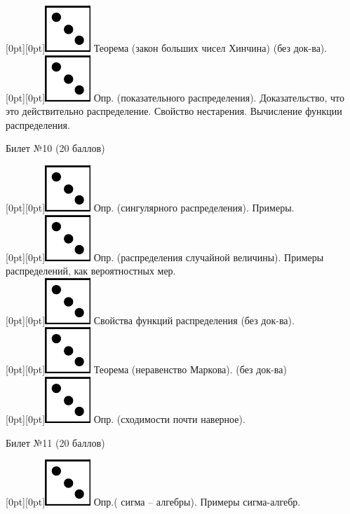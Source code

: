 \documentclass[preview]{standalone}
\begin{document}
\raisebox{-1pt}[0pt][0pt]{\includegraphics[width=0.02\linewidth]{3.png}} Теорема (закон больших чисел Хинчина) (без док-ва). \\
\raisebox{-1pt}[0pt][0pt]{\includegraphics[width=0.02\linewidth]{3.png}}  Опр. (показательного распределения). Доказательство, что это действительно распределение. Свойство нестарения. Вычисление функции распределения.  \\  
\begin{center} {\Large Билет №10 (20 баллов)} \end{center}
\raisebox{-1pt}[0pt][0pt]{\includegraphics[width=0.02\linewidth]{3.png}} Опр. (сингулярного распределения). Примеры. \\
\raisebox{-1pt}[0pt][0pt]{\includegraphics[width=0.02\linewidth]{3.png}} Опр. (распределения случайной величины). Примеры распределений, как вероятностных мер. \\
\raisebox{-1pt}[0pt][0pt]{\includegraphics[width=0.02\linewidth]{3.png}} Свойства функций распределения (без док-ва). \\
\raisebox{-1pt}[0pt][0pt]{\includegraphics[width=0.02\linewidth]{3.png}} Теорема (неравенство Маркова). (без док-ва) \\
\raisebox{-1pt}[0pt][0pt]{\includegraphics[width=0.02\linewidth]{3.png}} Опр. (сходимости почти наверное). \\
\begin{center} {\Large Билет №11 (20 баллов)} \end{center}
\raisebox{-1pt}[0pt][0pt]{\includegraphics[width=0.02\linewidth]{3.png}} Опр.( сигма – алгебры). Примеры сигма-алгебр. \\
\end{document}
